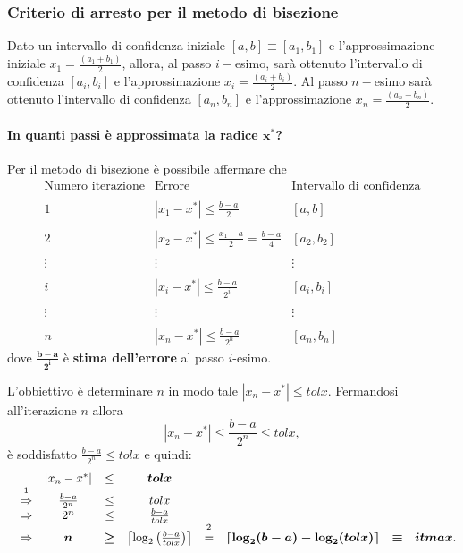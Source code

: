 \subsubsection{Criterio di arresto per il metodo di bisezione} Dato un intervallo di confidenza iniziale $[a,b]\equiv [a_1,b_1]$ e l'approssimazione iniziale $x_1=\frac{(a_1+b_1)}{2}$, allora, al passo $i-$esimo, sarà ottenuto l'intervallo di confidenza $[a_i,b_i]$ e l'approssimazione $x_i=\frac{(a_i+b_i)}{2}$. Al passo $n-$esimo sarà ottenuto l'intervallo di confidenza $[a_n,b_n]$ e l'approssimazione $x_n=\frac{(a_n+b_n)}{2}$.

\paragraph{In quanti passi è approssimata la radice $\boldsymbol{x^*}$?}
Per il metodo di bisezione è possibile affermare che
\begin{equation*}
	\begin{matrix}
		\text{Numero iterazione} & \text{Errore} & \text{Intervallo di confidenza}\\\\
		1 & |x_1-x^*| \leq \frac{b-a}{2} & [a,b] \\\\
		2 & |x_2-x^*|\leq \frac{x_1-a}{2}=\frac{b-a}{4}  & [a_2,b_2]\\\\
		\vdots & \vdots & \vdots \\\\
		i & |x_i-x^*|\leq\frac{b-a}{2^i} & [a_i,b_i]\\\\
		\vdots & \vdots & \vdots \\\\
		n & |x_n-x^*|\leq\frac{b-a}{2^n} & [a_n,b_n]
	\end{matrix}
\end{equation*}
dove $\boldsymbol{\frac{b-a}{2^i}}$ è \textbf{stima dell'errore} al passo $i$-esimo.

L'obbiettivo è determinare $n$ in modo tale $|x_n-x^*|\leq tolx$. Fermandosi all'iterazione $n$ allora 
\begin{equation*}
	|x_n-x^*|\leq\frac{b-a}{2^n}\leq tolx,
\end{equation*}
è soddisfatto $\frac{b-a}{2^n}\leq tolx$ e quindi:
\begin{equation*}
	\begin{matrix}
		&& |x_n-x^*| &\leq& \boldsymbol{tolx}\\
		&\overset{\footnotemark}{\Rightarrow}&\frac{b-a}{2^n}&\leq& tolx \\
		&\Rightarrow& 2^n&\leq&\frac{b-a}{tolx}\\
		&\Rightarrow& \boldsymbol n &\boldsymbol\geq&\left\lceil \log_{2}\left(\frac{b-a}{tolx}\right)\right\rceil&\overset{\footnotemark}{=}&\boldsymbol{\lceil \log_{2}(b-a)-\log_{2}(tolx)\rceil}&\boldsymbol\equiv& \boldsymbol{itmax}.
	\end{matrix}
\end{equation*}


